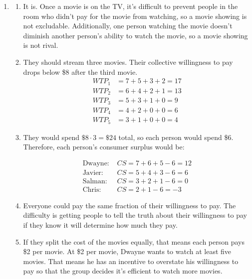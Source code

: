 \documentclass{article}
\begin{document}
\begin{enumerate}
\begin{enumerate}
	\item People might overuse the internet because they don’t account for the costs they create for others when they decide how much to use it. One way to correct that is by adding a paywall and thereby turning it into a private/club good.
	
	\end{enumerate}

\item

	\begin{enumerate}

	\item It is. Once a movie is on the TV, it's difficult to prevent people in the room who didn't pay for the movie from watching, so a movie showing is not excludable. Additionally, one person watching the movie doesn't diminish another person's ability to watch the movie, so a movie showing is not rival. 

	\item They should stream three movies. Their collective willingness to pay drops below \$8 after the third movie.
		\begin{align*}
		WTP_1 &= 7 + 5 + 3 + 2 = 17 \\
		WTP_2 &= 6 + 4 + 2 + 1 = 13 \\
		WTP_3 &= 5 + 3 + 1 + 0 = 9 \\
		WTP_4 &= 4 + 2 + 0 + 0 = 6 \\
		WTP_5 &= 3 + 1 + 0 + 0 = 4
		\end{align*}
	
	\item They would spend $\$8 \cdot 3 = \$24$ total, so each person would spend \$6. Therefore, each person's consumer surplus would be:
	
		\begin{align*}
		\text{Dwayne: } &CS = 7 + 6 + 5 - 6 = 12 \\
		\text{Javier: } &CS = 5 + 4 + 3 -6 = 6 \\
		\text{Salman: } &CS = 3 + 2 + 1 - 6 = 0 \\
		\text{Chris: } &CS = 2 + 1 - 6 = -3
		\end{align*}
		
	\item Everyone could pay the same fraction of their willingness to pay. The difficulty is getting people to tell the truth about their willingness to pay if they know it will determine how much they pay.
	
	\item If they split the cost of the movies equally, that means each person pays \$2 per movie. At \$2 per movie, Dwayne wants to watch at least five movies. That means he has an incentive to overstate his willingness to pay so that the group decides it's efficient to watch more movies. 
	

\end{enumerate}
\end{enumerate}
\end{document}
